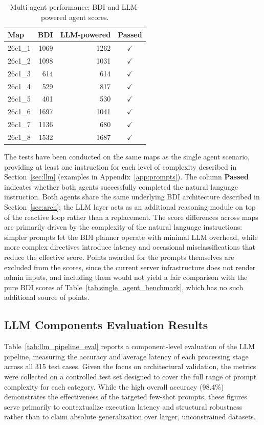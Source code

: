 \begin{table}[h]
\centering
\setlength{\tabcolsep}{10pt}
\caption{Multi-agent performance: BDI and LLM-powered agent scores.}\label{tab:multi_agent_benchmark}
\begin{tabular}{lrrc}
\hline
\textbf{Map} & \textbf{BDI} & \textbf{LLM-powered} & \textbf{Passed} \\ \hline
26c1\_1 & 1069 & 1262 & $\checkmark$ \\
26c1\_2 & 1098 & 1031 & $\checkmark$ \\
26c1\_3 & 614 & 614 & $\checkmark$ \\
26c1\_4 & 529 & 817 & $\checkmark$ \\
26c1\_5 & 401 & 530 & $\checkmark$ \\
26c1\_6 & 1697 & 1041 & $\checkmark$ \\
26c1\_7 & 1136 & 680 & $\checkmark$ \\
26c1\_8 & 1532 & 1687 & $\checkmark$ \\ \hline
\end{tabular}
\end{table}

The tests have been conducted on the same maps as the single agent scenario, providing at least one instruction for each level of complexity described in Section~\ref{sec:llm} (examples in Appendix~\ref{app:prompts}). The column \textbf{Passed} indicates whether both agents successfully completed the natural language instruction.
Both agents share the same underlying BDI architecture described in Section~\ref{sec:arch}; the LLM layer acts as an additional reasoning module on top of the reactive loop rather than a replacement.
The score differences across maps are primarily driven by the complexity of the natural language instructions: simpler prompts let the BDI planner operate with minimal LLM overhead, while more complex directives introduce latency and occasional misclassifications that reduce the effective score. Points awarded for the prompts themselves are excluded from the scores, since the current server infrastructure does not render admin inputs, and including them would not yield a fair comparison with the pure BDI scores of Table~\ref{tab:single_agent_benchmark}, which has no such additional source of points.

\subsection{LLM Components Evaluation Results}\label{sec:llm_results}
Table~\ref{tab:llm_pipeline_eval} reports a component-level evaluation of the LLM pipeline, measuring the accuracy and average latency of each processing stage across all 315 test cases. Given the focus on architectural validation, the metrics were collected on a controlled test set designed to cover the full range of prompt complexity for each category. While the high overall accuracy (98.4\%) demonstrates the effectiveness of the targeted few-shot prompts, these figures serve primarily to contextualize execution latency and structural robustness rather than to claim absolute generalization over larger, unconstrained datasets.

